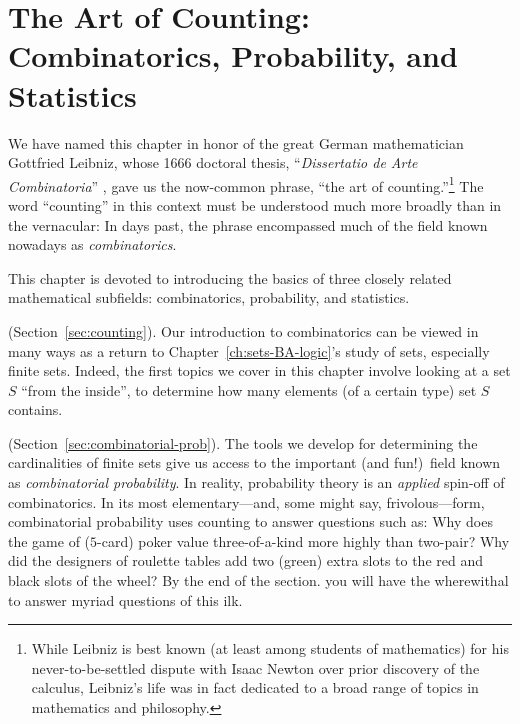 
\chapter{The Art of Counting:
Combinatorics, Probability, and Statistics}
\label{ch:prob-stat}
\label{ch:combinatorics}

We have named this chapter in honor of the great German mathematician
Gottfried Leibniz,  whose 1666 doctoral thesis, ``{\it Dissertatio de Arte Combinatoria}''
\cite{Leibnitz}, gave us the now-common phrase, ``the art of
counting.''\footnote{While Leibniz is best known (at least among students of mathematics) for his
never-to-be-settled dispute with Isaac Newton over prior discovery of the calculus, Leibniz's life
was in fact dedicated to a broad range of topics in mathematics and philosophy.}
The word ``counting'' in this context must be understood much more broadly than in the 
vernacular: In days past, the phrase encompassed much of the field known nowadays as
{\it combinatorics}. 

This chapter is devoted to introducing the basics of three closely related mathematical
subfields: combinatorics, probability, and statistics.

\medskip


 (Section~\ref{sec:counting}).
Our introduction to combinatorics can be viewed in many ways
as a return to Chapter~\ref{ch:sets-BA-logic}'s study of
sets, especially finite sets.  Indeed, the first topics we cover in
this chapter involve looking at a set $S$ ``from the inside'', to determine
how many elements (of a certain type) set $S$ contains.

\medskip

 
 
 (Section~\ref{sec:combinatorial-prob}).
The tools we develop for determining the cardinalities of finite sets
give us access to the important (and fun!)~field known as {\em combinatorial probability}. 
In reality, probability theory is an {\em applied} spin-off of combinatorics.  In its most 
elementary---and, some might say, frivolous---form, combinatorial probability uses counting to 
answer questions such as:  Why does the game of ($5$-card) poker value three-of-a-kind
more highly than two-pair?  Why did the designers of roulette tables add two (green) extra 
slots to the red and black slots of the wheel?  By the end of the section. you will have the 
wherewithal to answer myriad questions of this ilk. 

